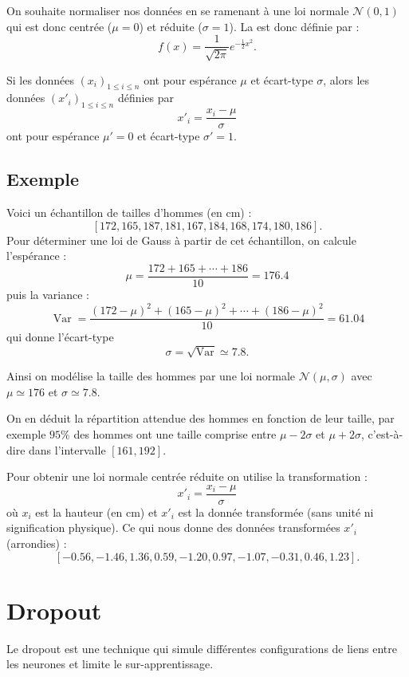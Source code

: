 \documentclass[11pt,class=report,crop=false]{standalone}
\begin{document}
On souhaite normaliser nos données en se ramenant à une loi normale $\mathcal{N}(0,1)$ qui est donc centrée ($\mu=0$) et réduite ($\sigma=1$). 
La  est donc définie par :
$$f(x) = \frac{1}{\sqrt{2\pi}} e^{-\frac12 x^2}.$$



Si les données $(x_i)_{1\le i \le n}$ ont pour espérance $\mu$ et écart-type $\sigma$,
alors les données $(x'_i)_{1\le i \le n}$ définies par 
$$x'_i = \frac{x_i-\mu}{\sigma}$$
ont pour espérance $\mu'=0$ et écart-type $\sigma'=1$.

\subsection{Exemple}
Voici un échantillon de tailles d'hommes (en cm) :
$$[172,165,187,181,167,184,168,174,180,186].$$
Pour déterminer une loi de Gauss à partir de cet échantillon, on calcule l'espérance :
$$\mu = \frac{172 + 165 + \cdots + 186}{10} = 176.4$$
puis la variance : 
$$\operatorname{Var} = \frac{(172-\mu)^2+(165-\mu)^2+\cdots + (186-\mu)^2}{10} = 61.04$$
qui donne l'écart-type
$$\sigma = \sqrt{\operatorname{Var}} \simeq 7.8.$$


Ainsi on modélise la taille des hommes par une loi normale $\mathcal{N}(\mu,\sigma)$
avec $\mu\simeq 176$ et $\sigma\simeq 7.8$.



On en déduit la répartition attendue des hommes en fonction de leur taille, par exemple 
$95\%$ des hommes ont une taille comprise entre $\mu-2\sigma$ et $\mu+2\sigma$, c'est-à-dire dans l'intervalle $[161,192]$.

Pour obtenir une loi normale centrée réduite on utilise la transformation :
$$x'_i = \frac{x_i-\mu}{\sigma}$$
où $x_i$ est la hauteur (en cm) et $x'_i$ est la donnée transformée (sans unité ni signification physique).
Ce qui nous donne des données transformées $x'_i$ (arrondies) :
$$[-0.56, -1.46, 1.36,  0.59, -1.20,  0.97,  -1.07, -0.31, 0.46, 1.23].$$


\section{Dropout}

Le dropout est une technique qui simule différentes configurations de liens entre les neurones et limite le sur-apprentissage.
\end{document}
